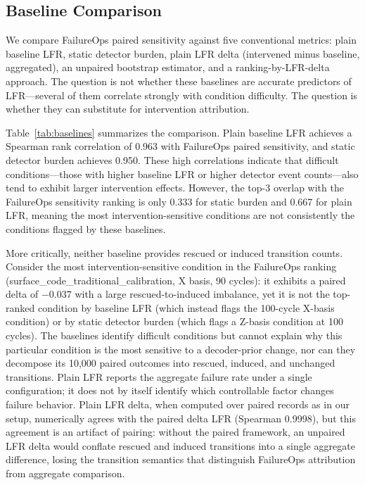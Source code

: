\subsection{Baseline Comparison}

We compare FailureOps paired sensitivity against five conventional metrics: plain baseline LFR, static detector burden, plain LFR delta (intervened minus baseline, aggregated), an unpaired bootstrap estimator, and a ranking-by-LFR-delta approach. The question is not whether these baselines are accurate predictors of LFR---several of them correlate strongly with condition difficulty. The question is whether they can substitute for intervention attribution.

Table~\ref{tab:baselines} summarizes the comparison. Plain baseline LFR achieves a Spearman rank correlation of 0.963 with FailureOps paired sensitivity, and static detector burden achieves 0.950. These high correlations indicate that difficult conditions---those with higher baseline LFR or higher detector event counts---also tend to exhibit larger intervention effects. However, the top-3 overlap with the FailureOps sensitivity ranking is only 0.333 for static burden and 0.667 for plain LFR, meaning the most intervention-sensitive conditions are not consistently the conditions flagged by these baselines.

More critically, neither baseline provides rescued or induced transition counts. Consider the most intervention-sensitive condition in the FailureOps ranking (surface\_code\_traditional\_calibration, X basis, 90 cycles): it exhibits a paired delta of $-0.037$ with a large rescued-to-induced imbalance, yet it is not the top-ranked condition by baseline LFR (which instead flags the 100-cycle X-basis condition) or by static detector burden (which flags a Z-basis condition at 100 cycles). The baselines identify difficult conditions but cannot explain why this particular condition is the most sensitive to a decoder-prior change, nor can they decompose its 10,000 paired outcomes into rescued, induced, and unchanged transitions. Plain LFR reports the aggregate failure rate under a single configuration; it does not by itself identify which controllable factor changes failure behavior. Plain LFR delta, when computed over paired records as in our setup, numerically agrees with the paired delta LFR (Spearman 0.9998), but this agreement is an artifact of pairing: without the paired framework, an unpaired LFR delta would conflate rescued and induced transitions into a single aggregate difference, losing the transition semantics that distinguish FailureOps attribution from aggregate comparison.

